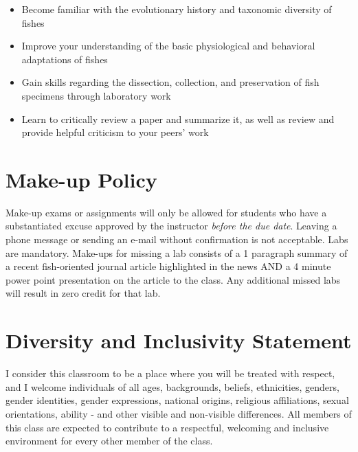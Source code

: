 \documentclass[letterpaper]{inzane_syllabus} %
\begin{document}
\begin{itemize}
\item Become familiar with the evolutionary history and taxonomic diversity of fishes
\item Improve your understanding of the basic physiological and behavioral adaptations of fishes
\item Gain skills regarding the dissection, collection, and preservation of fish specimens through laboratory work
\item Learn to critically review a paper and summarize it, as well as review and provide helpful criticism to your peers' work

\end{itemize}


\newpage %

\makeSide %


\vspace{0.5cm}
\section{Make-up Policy}

Make-up exams or assignments will only be allowed for students who have a substantiated excuse approved by the instructor \emph{before the due date}. Leaving a phone message or sending an e-mail without confirmation is not acceptable. Labs are mandatory. Make-ups for missing a lab consists of a 1 paragraph summary of a recent fish-oriented journal article highlighted in the news AND a 4 minute power point presentation on the article to the class. Any additional missed labs will result in zero credit for that lab.

\vspace{0.5cm}
\section{Diversity and Inclusivity Statement}

I consider this classroom to be a place where you will be treated with respect, and I welcome individuals of all ages, backgrounds, beliefs, ethnicities, genders, gender identities, gender expressions, national origins, religious affiliations, sexual orientations, ability - and other visible and non-visible differences. All members of this class are expected to contribute to a respectful, welcoming and inclusive environment for every other member of the class. 
\end{document}
